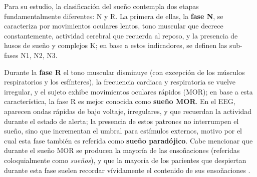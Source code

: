 Para su estudio, la clasificación del sueño 
contempla dos etapas fundamentalmente diferentes: N y R.
La primera de ellas, la \textbf{fase N}, se caracteriza por movimientos oculares lentos, tono 
muscular que decrece constantemente, actividad cerebral que recuerda al reposo, y la presencia de
husos de sueño y complejos K; en base a estos indicadores, se definen las sub-fases N1, N2, N3.
%

Durante la \textbf{fase R} el tono muscular disminuye (con excepción de los músculos respiratorios 
y los esfínteres), la frecuencia cardiaca y respiratoria se vuelve irregular, y el sujeto exhibe 
movimientos oculares rápidos (MOR); en base a esta característica, la fase R es mejor conocida 
como \textbf{sueño MOR}.
En el EEG, aparecen ondas rápidas de bajo voltaje, irregulares, y que recuerdan la actividad 
durante el estado de alerta; la presencia de estos patrones no interrumpen el sueño, sino que 
incrementan el umbral para estímulos externos, motivo por el cual esta fase también es referida como 
\textbf{sueño paradójico}.
%
Cabe mencionar que durante el sueño MOR se producen la mayoría de las ensoñaciones (referidas 
coloquialmente como \textit{sueños}), y que la mayoría de los pacientes que despiertan durante esta 
fase suelen recordar vívidamente el contenido de sus ensoñaciones 
\cite{Rosales14}.

